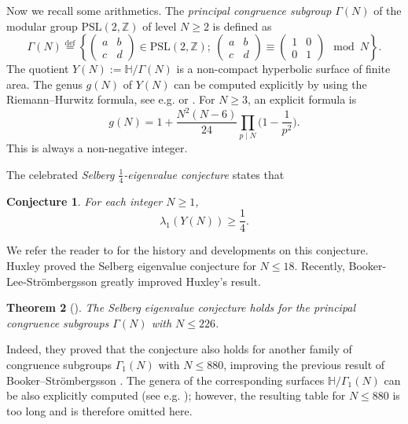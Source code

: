 \documentclass{amsart}
\renewcommand{\H}{\mathbb{H}}
\theoremstyle{plain}
\newtheorem{theorem}{Theorem}[section]
\newtheorem{conjecture}[theorem]{Conjecture}
\theoremstyle{definition}
\theoremstyle{remark}
\begin{document}
Now we recall some arithmetics. The \emph{principal congruence subgroup} $\Gamma(N)$ of the modular group $\mathrm{PSL}(2,\mathbb{Z})$ of level $N\geq2$ is defined as 
\begin{equation*}
    \Gamma(N) \overset{\mathrm{def}}{=} 
    \left\{ 
        \begin{pmatrix}
            a & b\\ c & d
        \end{pmatrix} \in \mathrm{PSL}(2,\mathbb{Z});\ 
        \begin{pmatrix}
            a & b\\ c & d
        \end{pmatrix} \equiv 
        \begin{pmatrix}
            1 & 0\\ 0 & 1
        \end{pmatrix} \mod N
    \right\}.
\end{equation*}
The quotient $Y(N):=\mathbb{H}/\Gamma(N)$ is a non-compact hyperbolic surface of finite area. 
The genus $g(N)$ of $Y(N)$ can be computed explicitly by using the Riemann--Hurwitz formula, see e.g. \cite{Shimura1971} or \cite[Page 108]{DS2005}. For $N \geq 3$, an explicit formula is
\begin{equation*}
    g(N) = 1 + \frac{N^2 (N-6)}{24} \prod_{p\mid N}\Big(1 - \frac{1}{p^2}\Big).
\end{equation*}
This is always a non-negative integer.

The celebrated \emph{Selberg $\frac{1}{4}$-eigenvalue conjecture} states that 
\begin{conjecture}
For each integer $N\geq1$, 
\begin{equation*}
    \lambda_1(Y(N))\geq \frac14. 
\end{equation*}
\end{conjecture}
\noindent We refer the reader to \cite{Selberg1965,GJ1978,LRS95,KS2002a,KS2002b,Kim03} for the history and developments on this conjecture. Huxley \cite{Huxley1985} proved the Selberg eigenvalue conjecture for $N\leq 18$.  Recently, Booker-Lee-Str{\"o}mbergsson \cite{BLS2020} greatly improved Huxley's result. 
\begin{theorem}[{\cite[Theorem 1.1]{BLS2020}}]
    The Selberg eigenvalue conjecture holds for the principal congruence subgroups $\Gamma(N)$ with $N\leq 226$. 
\end{theorem}
\noindent Indeed, they proved that the conjecture also holds for another family of congruence subgroups $\Gamma_1(N)$ with $N\leq 880$, improving the previous result of Booker--Str{\"o}mbergsson \cite{BS2007}. The genera of the corresponding surfaces $\H/\Gamma_1(N)$ can be also explicitly computed (see e.g. \cite[Page 108]{DS2005}); however, the resulting table for $N\leq 880$ is too long and is therefore omitted here.
\end{document}
